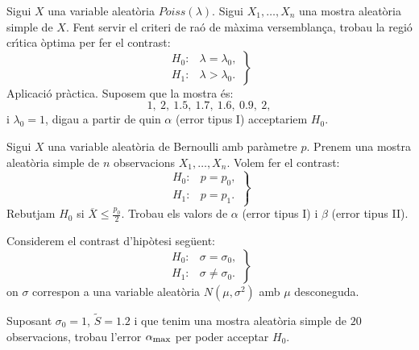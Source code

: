 \begin{prob}
{
Sigui $X$ una variable aleat\`oria $Poiss(\lambda)$. Sigui 
\mbox{$X_1,\ldots,X_n$} una mostra aleat\`oria simple de $X$. Fent servir
el criteri de ra\'o de m\`axima versemblan\c{c}a, trobau la regi\'o cr\'{\i}tica
\`optima per fer el contrast:
$$
\left.
\begin{array}{ll}
H_0 :& \lambda =  \lambda_0,\\
H_1 :& \lambda >  \lambda_0.
\end{array}
\right\}
$$
Aplicaci\'o pr\`actica. Suposem que la mostra \'es:
$$
1,\ 2,\ 1.5,\ 1.7,\ 1.6,\ 0.9,\ 2,
$$
i $\lambda_0 =1$, digau a partir de quin $\alpha$ (error tipus I) 
acceptariem $H_0$.
}
\end{prob}

\newpage

\begin{prob}
{
Sigui $X$ una variable aleat\`oria de Bernoulli amb par\`ametre $p$.
Prenem una mostra aleat\`oria simple de $n$ observacions \mbox{$X_1,
\ldots,X_n$}. Volem fer el contrast:
\[
\left.
\begin{array}{ll}
H_0 :&  p=p_0, \\
H_1 :&  p=p_1.
\end{array}
\right\}
\]
Rebutjam $H_0$ si $\overline{X}\leq\frac{p_0}{2}$. 
Trobau els valors de $\alpha$
(error tipus I) i $\beta$ (error tipus II).
\iffalse
($B(n,p)$ \'es la distribuci\'o binomial de par\`ametres $n$ i $p$ i $[x]$
\'es la part entera de $x$.)
\fi
{}
}
\end{prob}

\begin{prob}
{
Considerem el contrast d'hip\`otesi seg\"uent:
\[
\left.
\begin{array}{ll}
H_0 : & \sigma =\sigma_0, \\
H_1 : & \sigma\not =\sigma_0.
\end{array}
\right\}
\]
on $\sigma$ correspon a una variable aleat\`oria $N(\mu,\sigma^2)$ amb
$\mu$ desconeguda.

Suposant $\sigma_0=1$, $\tilde{S}=1.2$ i que tenim una mostra aleat\`oria
simple de $20$ observacions, trobau l'error $\alpha_{\mbox{\footnotesize max}}$
per poder acceptar $H_0$.
}
\end{prob}

